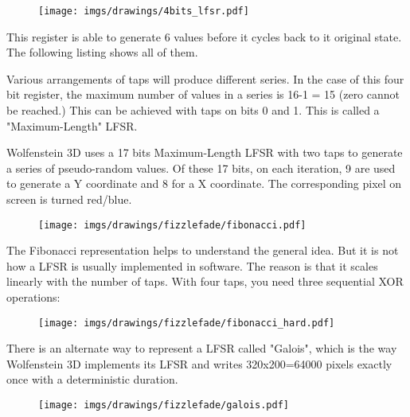 \begin{figure}[H]
 \centering
  \texttt{[image: imgs/drawings/4bits\_lfsr.pdf]}
\end{figure}
This register is able to generate 6 values before it cycles back to it original state. The following listing shows all of them.\\
\par
\begin{minipage}{\textwidth}

\end{minipage}
\par
Various arrangements of taps will produce different series. In the case of this four bit register, the maximum number of values in a series is 16-1 = 15 (zero cannot be reached.) This can be achieved with taps on bits 0 and 1. This is called a "Maximum-Length" LFSR.\\
\par
\begin{minipage}{\textwidth}

\end{minipage}
\par
\par
Wolfenstein 3D  uses a 17 bits Maximum-Length LFSR with two taps to generate a series of pseudo-random values. Of these 17 bits, on each iteration, 9 are used to generate a Y coordinate and 8 for a X coordinate. The corresponding pixel on screen is turned red/blue.\\
\par
\begin{figure}[H] \centering \texttt{[image: imgs/drawings/fizzlefade/fibonacci.pdf]} \end{figure}
\par
The Fibonacci representation helps to understand the general idea. But it is not how a LFSR is usually implemented in software. The reason is that it scales linearly with the number of taps. With four taps, you need three sequential XOR operations:
\par
\begin{figure}[H] \centering \texttt{[image: imgs/drawings/fizzlefade/fibonacci\_hard.pdf]} \end{figure}
\par
There is an alternate way to represent a LFSR called "Galois", which is the way Wolfenstein 3D implements its LFSR and writes 320x200=64000 pixels exactly once with a deterministic duration.
\par
\begin{figure}[H] \centering \texttt{[image: imgs/drawings/fizzlefade/galois.pdf]} \end{figure}
      
